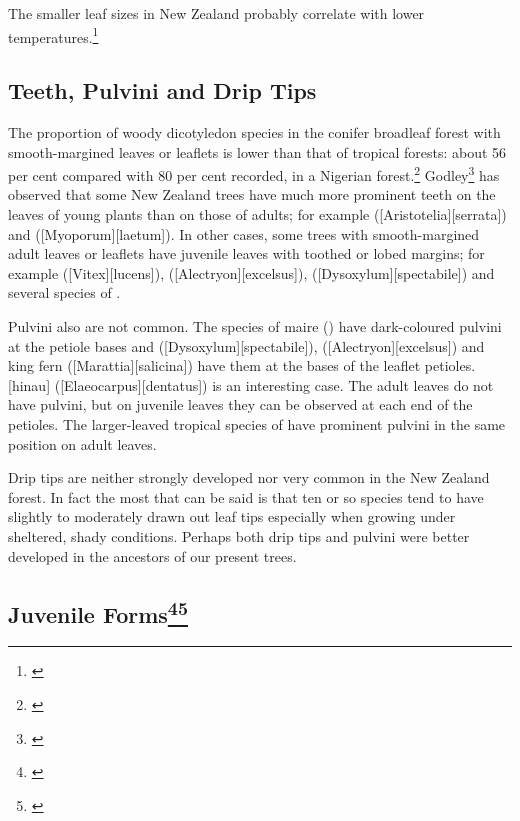 The smaller leaf sizes in New Zealand probably correlate with lower temperatures.\footnote{\cite{dawson1986floristic}}

\subsection{Teeth, Pulvini and Drip Tips}

The proportion of woody dicotyledon species in the conifer broadleaf forest with smooth-margined leaves or leaflets is lower than that of tropical forests: about 56 per cent compared with 80 per cent recorded, in a Nigerian forest.\footnote{\cite{richards1952tropical}}
Godley\footnote{\cite{godley1985paths}} has observed that some New Zealand trees have much more prominent teeth on the leaves of young plants than on those of adults; for example  ([Aristotelia][serrata]) and  ([Myoporum][laetum]).
In other cases, some trees with smooth-margined adult leaves or leaflets have juvenile leaves with toothed or lobed margins; for example  ([Vitex][lucens]),  ([Alectryon][excelsus]),  ([Dysoxylum][spectabile]) and several species of .

Pulvini also are not common.
The species of maire () have dark-coloured pulvini at the petiole bases and  ([Dysoxylum][spectabile]),  ([Alectryon][excelsus]) and king fern ([Marattia][salicina]) have them at the bases of the leaflet petioles.
[hinau] ([Elaeocarpus][dentatus]) is an interesting case.
The adult leaves do not have pulvini, but on juvenile leaves they can be observed at each end of the petioles.
The larger-leaved tropical species of  have prominent pulvini in the same position on adult leaves.

Drip tips are neither strongly developed nor very common in the New Zealand forest.
In fact the most that can be said is that ten or so species tend to have slightly to moderately drawn out leaf tips especially when growing under sheltered, shady conditions.
Perhaps both drip tips and pulvini were better developed in the ancestors of our present trees.

\subsection[Juvenile Forms]{Juvenile Forms\thinspace\footnote{\cite{godley1985paths}}\footnote{\cite{philipson1964habit}}}

